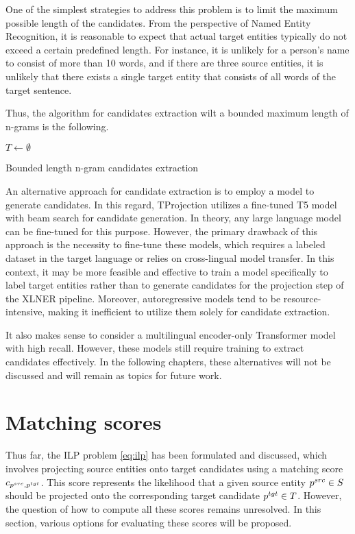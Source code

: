 One of the simplest strategies to address this problem is to limit the maximum
possible length of the candidates. From the perspective of Named Entity Recognition,
it is reasonable to expect that actual target entities typically do not exceed a
certain predefined length. For instance, it is unlikely for a person's name to consist
of more than 10 words, and if there are three source entities, it is unlikely
that there exists a single target entity that consists of all words of the target
sentence.

Thus, the algorithm for candidates extraction wilt a bounded maximum length of n-grams
is the following.
\begin{algorithm}

  \( T \gets \emptyset \) \;
  \caption{Bounded length n-gram candidates extraction}
  \label{alg:ngram_extraction}
\end{algorithm}

An alternative approach for candidate extraction is to employ a model to generate
candidates. In this regard, TProjection \cite{garcia-ferrero-etal-2023-projection} utilizes a fine-tuned T5 model with beam
search for candidate generation. In theory, any large language model can be
fine-tuned for this purpose. However, the primary drawback of this approach is
the necessity to fine-tune these models, which requires a labeled dataset in
the target language or relies on cross-lingual model transfer. In this context,
it may be more feasible and effective to train a model specifically to label target
entities rather than to generate candidates for the projection step of the
XLNER pipeline. Moreover, autoregressive models tend to be resource-intensive,
making it inefficient to utilize them solely for candidate extraction.

It also makes sense to consider a multilingual encoder-only Transformer \cite{vaswani2017attention}
model with high recall. However, these models still require training to extract candidates
effectively. In the following chapters, these alternatives will not be discussed
and will remain as topics for future work.

\section{Matching scores}
Thus far, the ILP problem \eqref{eq:ilp} has been formulated and discussed,
which involves projecting source entities onto target candidates using a matching
score \( c_{p^{src}, p^{tgt}} \). This score represents the likelihood that a given
source entity \( p^{src} \in S \) should be projected onto the corresponding target
candidate \( p^{tgt} \in T \). However, the question of how to compute all these
scores remains unresolved. In this section, various options for evaluating these
scores will be proposed.

